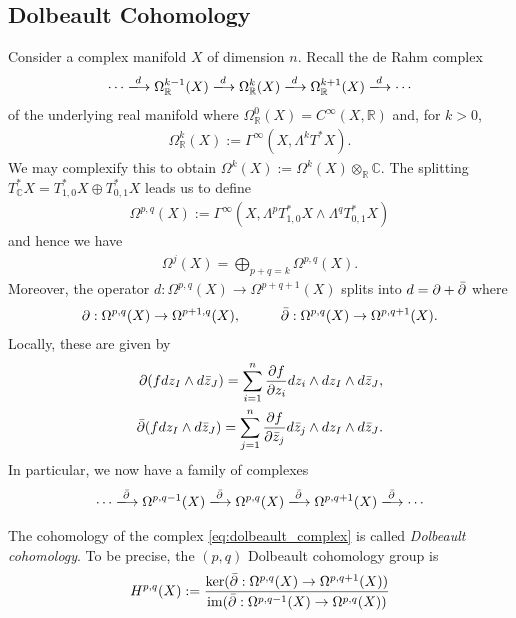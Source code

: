 \documentclass[12pt]{ociamthesis}  %
\begin{document}
\subsection{Dolbeault Cohomology}
\missingcitation

Consider a complex manifold $X$ of dimension $n$. Recall the de Rahm
complex
\begin{align*}
  \cdots \xlongrightarrow{d}
  \Omega_{\mathbb{R}}^{k-1}(X)\xlongrightarrow{d}
  \Omega_{\mathbb{R}}^{k}(X)\xlongrightarrow{d}
  \Omega_{\mathbb{R}}^{k+1}(X)\xlongrightarrow{d}
  \cdots
\end{align*}
of the underlying real manifold where
$\Omega^0_{\mathbb{R}}(X) = C^\infty(X,\mathbb{R})$ and,
for $k > 0$,
\begin{align*}
  \Omega^k_{\mathbb{R}}(X) := \Gamma^\infty(X,\Lambda^k T^*X).
\end{align*}
We may complexify this to obtain
$\Omega^k(X) := \Omega^k(X)\otimes_{\mathbb{R}} \mathbb{C}$.
The splitting $T^*_\mathbb{C} X = T^*_{1,0}X \oplus T^*_{0,1}X$
leads us to define
\begin{align*}
  \Omega^{p,q}(X)
  := \Gamma^\infty(X,\Lambda^p T^*_{1,0}X \wedge\Lambda^q T^*_{0,1}X)
\end{align*}
and hence we have
\begin{align*}
  \Omega^j(X) = \bigoplus_{p+q=k} \Omega^{p,q}(X).
\end{align*}
Moreover, the operator $d : \Omega^{p,q}(X) \to \Omega^{p+q+1}(X)$
splits into $d = \partial + \bar{\partial}$ where
\begin{align*}
  \partial : \Omega^{p,q}(X) \to \Omega^{p+1,q}(X),\hspace{1cm}
  \bar{\partial} : \Omega^{p,q}(X) \to \Omega^{p,q+1}(X).
\end{align*}
Locally, these are given by
\begin{align*}
  \partial (f dz_I \wedge d\bar z_J) = \sum_{i=1}^n \frac{\partial f}{\partial z_i} dz_i\wedge dz_I \wedge d\bar z_J, \\
  \bar{\partial} (f dz_I \wedge d\bar z_J) = \sum_{j=1}^n \frac{\partial f}{\partial \bar z_j} d\bar z_j\wedge dz_I \wedge d\bar z_J.
\end{align*}
In particular, we now have a family of complexes
\begin{align}\label{eq:dolbeault_complex}
  \cdots \xlongrightarrow{\dol}
  \Omega^{p,q-1}(X)\xlongrightarrow{\dol}
  \Omega^{p,q}(X)\xlongrightarrow{\dol}
  \Omega^{p,q+1}(X)\xlongrightarrow{\dol}
  \cdots
\end{align}
\begin{definition}
  The cohomology of the complex \ref{eq:dolbeault_complex} is
  called \emph{Dolbeault cohomology}. To be precise, the
  $(p,q)$ Dolbeault cohomology group is
  \begin{align*}
    H^{p,q}(X) := \frac{
      \ker(\bar{\partial} : \Omega^{p,q}(X) \to \Omega^{p,q+1}(X))
    }{
      \operatorname{im}(\bar{\partial} : \Omega^{p,q-1}(X) \to \Omega^{p,q}(X))
    }
  \end{align*}
\end{definition}
\end{document}

